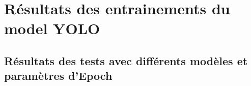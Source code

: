 
\chapter{Résultats des entrainements du model YOLO}

\section*{Résultats des tests avec différents modèles et paramètres d'Epoch}

